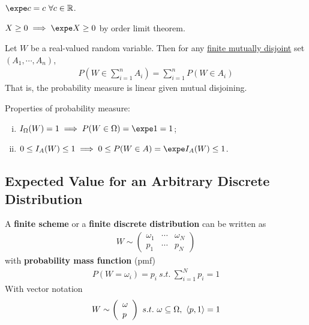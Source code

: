 \documentclass{article}
\begin{document}
   	\begin{proposition}
   		$\expe c = c\ \forall c \in \R$.
   	\end{proposition}
   	
   	\begin{proposition}
   		$X \geq 0 \implies \expe X \geq 0$ by order limit theorem.
   	\end{proposition}
   	
   	\begin{theorem}
   		Let $W$ be a real-valued random variable. Then for any \ul{finite mutually disjoint} set $(A_1, \cdots, A_n)$, 
   		\begin{align}
   			P(W \in \sum_{i=1}^n A_i) = \sum_{i=1}^n P(W \in A_i)
   		\end{align}
   		That is, the probability measure is linear given mutual disjoining.
   	\end{theorem}
   	
   	\begin{proposition}
   		Properties of probability measure:
   		\begin{enumerate}[(i)]
   			\item $I_\Omega(W) = 1 \implies P(W \in \Omega) = \expe 1 = 1$;
   			\item $0 \leq I_A(W) \leq 1 \implies 0 \leq P(W \in A) = \expe I_A(W) \leq 1$.
   		\end{enumerate}
   	\end{proposition}
   	
   	

	\subsection{Expected Value for an Arbitrary Discrete Distribution}
	\begin{definition}
		A \textbf{finite scheme} or a \textbf{finite discrete distribution} can be written as
		\begin{align}
			W \sim\left(\begin{array}{lll}{\omega_{1}} & {\cdots} & {\omega_{N}} \\ {p_{1}} & {\cdots} & {p_{N}}\end{array}\right)
		\end{align}
		with \textbf{probability mass function} (pmf)
		\begin{align}
			P\left(W=\omega_{i}\right)=p_{i}\ s.t.\ \sum_{i=1}^N p_i = 1
		\end{align}
		With vector notation
		\begin{align}
			W \sim\left(\begin{array}{l}{\omega} \\ p\end{array}\right)\ s.t.\ \omega \subseteq \Omega,\ \inner{p}{1} = 1
		\end{align}
	\end{definition}
	
\end{document}
